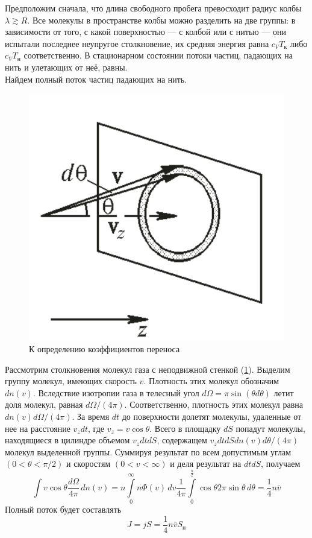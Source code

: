 \documentclass[12pt]{article}
\begin{document}
        Предположим сначала, что длина свободного пробега превосходит радиус колбы $\lambda \gtrsim R$.
        Все молекулы в пространстве колбы можно разделить на две группы: в зависимости от того, с какой поверхностью —
        с колбой или с нитью — они испытали последнее неупругое столкновение, их средняя энергия равна $c_VT_\text{к}$ либо $c_VT_\text{н}$
        соответственно. В стационарном состоянии потоки частиц, падающих на нить и улетающих от неё, равны.\\
        Найдем полный поток частиц падающих на нить.
        \begin{figure}[H]
            \centering
            \includegraphics[width=0.4\linewidth]{collision_with_wall.png}
            \caption{К определению коэффициентов переноса}
            \label{collision}
        \end{figure}
        Рассмотрим столкновения молекул газа с неподвижной стенкой (\ref{collision}). Выделим группу молекул,
        имеющих скорость $v$. Плотность этих молекул обозначим $dn(v)$. Вследствие изотропии газа в телесный угол
        $d\Omega = \pi \sin(\theta d\theta)$ летит доля молекул, равная $d\Omega/(4\pi)$. Соответственно,
        плотность этих молекул равна $dn(v)d\Omega/(4\pi)$. За время $dt$ до поверхности долетят молекулы, удаленные
        от нее на расстояние $v_zdt$, где $v_z = v \cos\theta$. Всего в площадку $dS$ попадут молекулы, находящиеся в
        цилиндре объемом $v_zdtdS$, содержащем $v_zdtdSdn(v)d\theta/(4\pi)$ молекул выделенной группы. Суммируя результат
        по всем допустимым углам $(0 < \theta < \pi/2)$ и скоростям $(0 < v < \infty)$ и деля результат на $dtdS$, получаем
        \begin{equation}
            \int\limits v \cos\theta\frac{d\Omega}{4\pi}\,dn(v) = n\int\limits_0^\infty n\Phi(v)\,dv \frac{1}{4\pi}\int\limits_0^\frac{\pi}{2} \cos\theta 2\pi \sin\theta\,d\theta = \frac{1}{4}n\overline{v}
        \end{equation}
        Полный поток будет составлять
        \[
            J = jS = \frac{1}{4}n\overline{v}S_{\text{н}}
        \]
\end{document}
